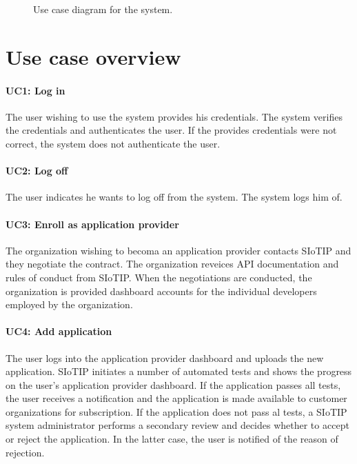 \documentclass[english]{sareport}
\begin{document}
\begin{figure}[!htp]
    \centering
    \caption{Use case diagram for the system.}\label{fig:use_case_model}
\end{figure}

\section{Use case overview}\label{sec:uc_overview}
\paragraph{UC1: Log in}
The user wishing to use the system provides his credentials.
The system verifies the credentials and authenticates the user.
If the provides credentials were not correct, the system does not authenticate the user.

\paragraph{UC2: Log off}
The user indicates he wants to log off from the system.
The system logs him of.

\paragraph{UC3: Enroll as application provider}
The organization wishing to becoma an application provider contacts SIoTIP and they negotiate the contract. The organization reveices API documentation and rules of conduct from SIoTIP. When the negotiations are conducted, the organization is provided dashboard accounts for the individual developers employed by the organization.

\paragraph{UC4: Add application}
The user logs into the application provider dashboard and uploads the new application. SIoTIP initiates a number of automated tests and shows the progress on the user's application provider dashboard. If the application passes all tests, the user receives a notification and the application is made available to customer organizations for subscription. If the application does not pass al tests, a SIoTIP system administrator performs a secondary review and decides whether to accept or reject the application. In the latter case, the user is notified of the reason of rejection.
\end{document}

